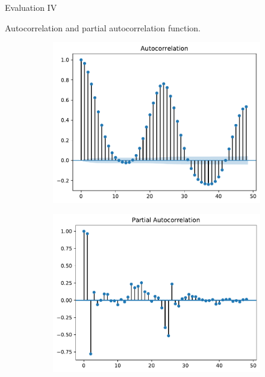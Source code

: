 \documentclass[t,xcolor={table},fleqn]{beamer}
\begin{document}
\begin{frame}{Evaluation IV}

Autocorrelation and partial autocorrelation function.

\begin{figure}[h!]%
	\centering
	\begin{subfigure}{.5\textwidth}
		\centering
		\includegraphics[width=\textwidth]{../doc/plots/ACF/load_48lags_ndiff0_hstep1}%
		\label{fig:acf_load_lags48}%
	\end{subfigure}%
	\begin{subfigure}{.5\textwidth}
		\centering
		\includegraphics[width=\textwidth]{../doc/plots/PACF/load_48lags_ndiff0_hstep1}%
		\label{fig:pacf_load_lags48}%
	\end{subfigure}
\end{figure}

\end{frame}
\end{document}
